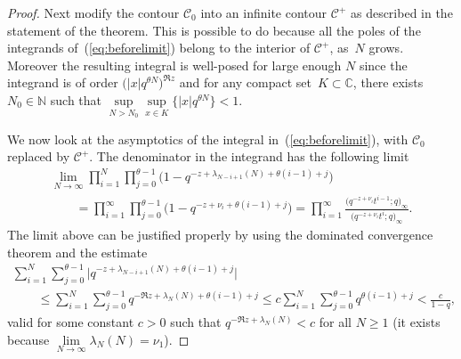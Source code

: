 \documentclass[pdftex]{sigma}
\numberwithin{equation}{section}
\newcommand{\C}{\mathbb{C}}
\newcommand{\N}{\mathbb{N}}
\newcommand{\CC}{\mathcal{C}}
\begin{document}
\begin{proof}
Next modify the contour $\CC_0$ into an inf\/inite contour $\CC^+$ as described in the statement of the theorem. This is possible to do because all the poles of the integrands of~(\ref{eq:beforelimit}) belong to the interior of $\CC^+$, as~$N$ grows. Moreover the resulting integral is well-posed for large enough $N$ since the integrand is of order $\big(|x|q^{\theta N}\big)^{\Re z}$ and for any compact set~$K\subset\C$, there exists $N_0\in\N$ such that $\sup\limits_{N>N_0}\sup\limits_{x\in K}{\big\{|x|q^{\theta N}\big\}} < 1$.

We now look at the asymptotics of the integral in~(\ref{eq:beforelimit}), with $\CC_0$ replaced by $\CC^+$. The denominator in the integrand has the following limit
\begin{gather*}
\lim_{N\rightarrow\infty}{\prod_{i=1}^N\prod_{j=0}^{\theta-1}{\big(1 - q^{-z + \lambda_{N-i+1}(N) + \theta(i-1) + j} \big) }}\\
 \qquad{} = \prod_{i=1}^{\infty}\prod_{j=0}^{\theta - 1}{\big( 1 - q^{-z + \nu_i + \theta(i-1) + j} \big)} = \prod_{i=1}^{\infty}{\frac{\big(q^{-z + \nu_i}t^{i-1}; q\big)_{\infty}}{\big(q^{-z+\nu_i}t^i; q\big)_{\infty}}}.
\end{gather*}
The limit above can be justif\/ied properly by using the dominated convergence theorem and the estimate
\begin{gather*}
\sum_{i=1}^N\sum_{j=0}^{\theta-1}{\big| q^{-z + \lambda_{N-i+1}(N) + \theta(i-1)+j} \big|} \\
\qquad{} \leq \sum_{i=1}^N\sum_{j=0}^{\theta-1}{q^{-\Re z + \lambda_N(N) + \theta(i-1)+j}} \leq c\sum_{i=1}^N\sum_{j=0}^{\theta - 1}{q^{\theta(i-1)+j}} < \frac{c}{1 - q},
\end{gather*}
valid for some constant $c>0$ such that $q^{-\Re z + \lambda_N(N)} < c$ for all $N\geq 1$ (it exists because $\lim\limits_{N\rightarrow\infty}{\lambda_N(N)} = \nu_1$).


\end{proof}
\end{document}
